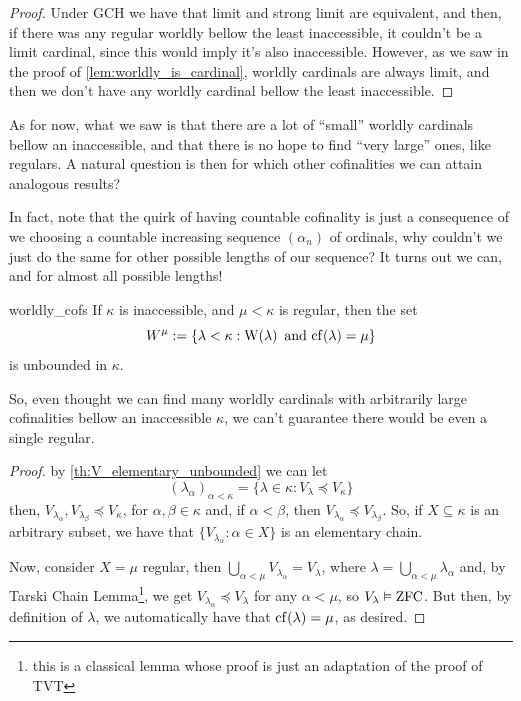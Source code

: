 \begin{proof}
    Under GCH we have that limit and strong limit are equivalent, and then, if there was any regular worldly bellow the least inaccessible, it couldn't be a limit cardinal, since this would imply it's also inaccessible. However, as we saw in the proof of \cref{lem:worldly_is_cardinal}, worldly cardinals are always limit, and then we don't have any worldly cardinal bellow the least inaccessible.
\end{proof}

As for now, what we saw is that there are a lot of ``small'' worldly cardinals bellow an inaccessible, and that there is no hope to find ``very large'' ones, like regulars. A natural question is then for which other cofinalities we can attain analogous results?

In fact, note that the quirk of having countable cofinality is just a consequence of we choosing a countable increasing sequence $(\alpha_n)$ of ordinals, why couldn't we just do the same for other possible lengths of our sequence? It turns out we can, and for almost all possible lengths!

\begin{corollary}{}{worldly_cofs}
    If $\kappa$ is inaccessible, and $\mu<\kappa$ is regular, then the set
    $$W^\mu:=\{\lambda<\kappa:\mathrm{W}\!\left(\lambda\right)\text{ and }\mathrm{cf}\!\left(\lambda\right)=\mu\}$$
    is unbounded in $\kappa$.
\end{corollary}

So, even thought we can find many worldly cardinals with arbitrarily large cofinalities bellow an inaccessible $\kappa$, we can't guarantee there would be even a single regular.

\begin{proof}
    by \cref{th:V_elementary_unbounded} we can let
    $$(\lambda_\alpha)_{\alpha<\kappa}=\{\lambda\in\kappa:V_\lambda\preceq V_\kappa\}$$
    then, $V_{\lambda_\alpha},V_{\lambda_\beta}\preceq V_\kappa$, for $\alpha,\beta\in\kappa$ and, if $\alpha<\beta$, then $V_{\lambda_\alpha}\preceq V_{\lambda_\beta}$. So, if $X\subseteq\kappa$ is an arbitrary subset, we have that $\{V_{\lambda_\alpha}:\alpha\in X\}$ is an elementary chain.

    Now, consider $X=\mu$ regular, then $\bigcup_{\alpha<\mu}V_{\lambda_\alpha}=V_\lambda$, where $\lambda=\bigcup_{\alpha<\mu}\lambda_\alpha$ and, by Tarski Chain Lemma\footnote{this is a classical lemma whose proof is just an adaptation of the proof of TVT}, we get $V_{\lambda_\alpha}\preceq V_\lambda$ for any $\alpha<\mu$, so $V_\lambda\vDash\mathrm{ZFC}$. But then, by definition of $\lambda$, we automatically have that $\mathrm{cf}\!\left(\lambda\right)=\mu$, as desired.
\end{proof}


